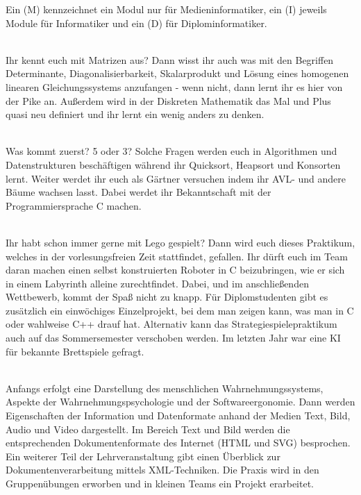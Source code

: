 
Ein (M) kennzeichnet ein Modul nur für Medieninformatiker, ein (I) jeweils Module für Informatiker und ein (D) für Diplominformatiker.


\textbf{}\\
Ihr kennt euch mit Matrizen aus?
Dann wisst ihr auch was mit den Begriffen Determinante, Diagonalisierbarkeit, Skalarprodukt und Lösung eines homogenen linearen Gleichungssystems anzufangen - wenn nicht, dann lernt ihr es hier von der Pike an.
Außerdem wird in der Diskreten Mathematik das Mal und Plus quasi neu definiert und ihr lernt ein wenig anders zu denken.

\textbf{} \\
Was kommt zuerst?
5 oder 3?
Solche Fragen werden euch in Algorithmen und Datenstrukturen beschäftigen während ihr Quicksort, Heapsort und Konsorten lernt.
Weiter werdet ihr euch als Gärtner versuchen indem ihr AVL- und andere Bäume wachsen lasst.
Dabei werdet ihr Bekanntschaft mit der Programmiersprache C machen.

\textbf{} \\
Ihr habt schon immer gerne mit Lego gespielt?
Dann wird euch dieses Praktikum, welches in der vorlesungsfreien Zeit stattfindet, gefallen.
Ihr dürft euch im Team daran machen einen selbst konstruierten Roboter in C beizubringen, wie er sich in einem Labyrinth alleine zurechtfindet.
Dabei, und im anschließenden Wettbewerb, kommt der Spaß nicht zu knapp.
Für Diplomstudenten gibt es zusätzlich ein einwöchiges Einzelprojekt, bei dem man zeigen kann, was man in C oder wahlweise C++ drauf hat. Alternativ kann das Strategiespielepraktikum auch auf das Sommersemester verschoben werden.
Im letzten Jahr war eine KI für bekannte Brettspiele gefragt.

\textbf{} \\
Anfangs erfolgt eine Darstellung des menschlichen Wahrnehmungssystems, Aspekte der Wahrnehmungspsychologie und der Softwareergonomie.
Dann werden Eigenschaften der Information und Datenformate anhand der Medien Text, Bild, Audio und Video dargestellt.
Im Bereich Text und Bild werden die entsprechenden Dokumentenformate des Internet (HTML und SVG) besprochen.
Ein weiterer Teil der Lehrveranstaltung gibt einen Überblick zur Dokumentenverarbeitung mittels XML-Techniken.
Die Praxis wird in den Gruppenübungen erworben und in kleinen Teams ein Projekt erarbeitet.

